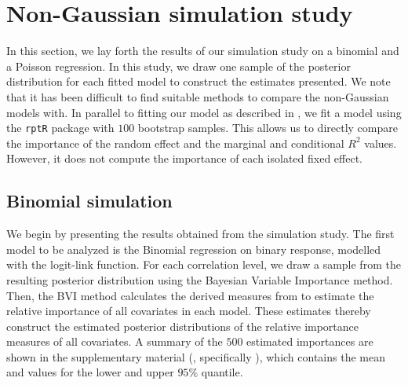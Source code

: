 \section{Non-Gaussian simulation study}
In this section, we lay forth the results of our simulation study on a binomial and a Poisson regression. In this study, we draw one sample of the posterior distribution for each fitted model to construct the estimates presented. We note that it has been difficult to find suitable methods to compare the non-Gaussian models with. In parallel to fitting our model as described in , we fit a model using the \texttt{rptR} package with $100$ bootstrap samples. This allows us to directly compare the importance of the random effect and the marginal and conditional $R^2$ values. However, it does not compute the importance of each isolated fixed effect.  
\subsection{Binomial simulation}
We begin by presenting the results obtained from the simulation study. The first model to be analyzed is the Binomial regression on binary response, modelled with the logit-link function. For each correlation level, we draw a sample from the resulting posterior distribution using the Bayesian Variable Importance method. Then, the BVI method calculates the derived measures from  to estimate the relative importance of all covariates in each model. These estimates thereby construct the estimated posterior distributions of the relative importance measures of all covariates. A summary of the $500$ estimated importances are shown in the supplementary material (, specifically ), which contains the mean and values for the lower and upper $95\%$ quantile.
